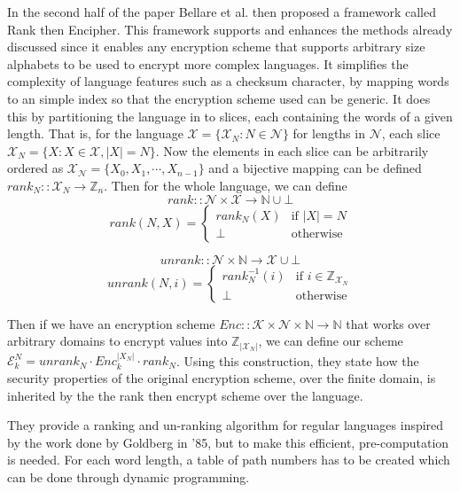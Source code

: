 \documentclass[10pt,a4paper]{article}
\begin{document}
In the second half of the paper\cite{fpe} Bellare et al. then proposed a framework called Rank then Encipher. This framework supports and enhances the methods already discussed since it enables any encryption scheme that supports arbitrary size alphabets to be used to encrypt more complex languages. It simplifies the complexity of language features such as a checksum character, by mapping words to an simple index so that the encryption scheme used can be generic. It does this by partitioning the language in to slices, each containing the words of a given length. That is, for the language $\mathcal{X} = \{\mathcal{X}_N : N \in \mathcal{N} \}$ for lengths in $\mathcal{N}$, each slice $\mathcal{X}_N = \{ X : X \in \mathcal{X}, \vert X \vert = N  \}$. Now the elements in each slice can be arbitrarily ordered as $\mathcal{X_N} = \{ X_0, X_1, \cdots , X_{n-1} \} $ and a bijective mapping can be defined $rank_N :: \mathcal{X}_N \rightarrow \mathbb{Z}_n$.
Then for the whole language, we can define
$$ rank :: \mathcal{N} \times \mathcal{X} \rightarrow \mathbb{N} \cup \bot $$
$$ rank(N,X) =
\left\{
	\begin{array}{ll}
		rank_N(X)  & \mbox{if } \vert X \vert = N\\
		\bot & \mbox{otherwise} 
	\end{array}
\right.
$$

$$ unrank :: \mathcal{N} \times \mathbb{N} \rightarrow \mathcal{X} \cup \bot $$
$$ unrank(N,i) =
\left\{
	\begin{array}{ll}
		rank_N^{-1}(i)  & \mbox{if } i \in \mathbb{Z}_{\mathcal{X}_N}\\
		\bot & \mbox{otherwise} 
	\end{array}
\right.
$$

Then if we have an encryption scheme $Enc :: \mathcal{K} \times \mathcal{N} \times \mathbb{N} \rightarrow \mathbb{N}$ that works over arbitrary domains to encrypt values into $\mathbb{Z}_{|\mathcal{X}_N|}$, we can define our scheme $\mathcal{E}_k^N = unrank_N \cdot Enc_k^{|X_N|} \cdot rank_N$. Using this construction, they state how the security properties of the original encryption scheme, over the finite domain, is inherited by the the rank then encrypt scheme over the language.

They provide a ranking and un-ranking algorithm for regular languages inspired by the work done by Goldberg in '85\cite{rank}, but to make this efficient, pre-computation is needed. For each word length, a table of path numbers has to be created which can be done through dynamic programming.
\end{document}
